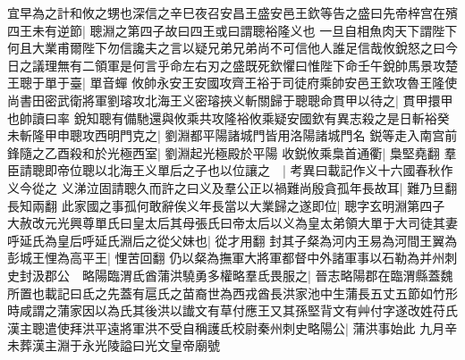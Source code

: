 宜早為之計和攸之甥也深信之辛巳夜召安昌王盛安邑王欽等告之盛曰先帝梓宫在殯四王未有逆節|{
	聰淵之第四子故曰四王或曰謂聰裕隆义也}
一旦自相魚肉天下謂陛下何且大業甫爾陛下勿信讒夫之言以疑兄弟兄弟尚不可信他人誰足信哉攸銳怒之曰今日之議理無有二領軍是何言乎命左右刃之盛既死欽懼曰惟陛下命壬午銳帥馬景攻楚王聰于單于臺|{
	單音蟬}
攸帥永安王安國攻齊王裕于司徒府乘帥安邑王欽攻魯王隆使尚書田密武衛將軍劉璿攻北海王义密璿挾义斬關歸于聰聰命貫甲以待之|{
	貫甲擐甲也帥讀曰率}
銳知聰有備馳還與攸乘共攻隆裕攸乘疑安國欽有異志殺之是日斬裕癸未斬隆甲申聰攻西明門克之|{
	劉淵都平陽諸城門皆用洛陽諸城門名}
鋭等走入南宫前鋒隨之乙酉殺和於光極西室|{
	劉淵起光極殿於平陽}
收鋭攸乘梟首通衢|{
	梟堅堯翻}
羣臣請聰即帝位聰以北海王义單后之子也以位讓之　|{
	考異曰載記作义十六國春秋作义今從之}
义涕泣固請聰久而許之曰义及羣公正以禍難尚殷貪孤年長故耳|{
	難乃旦翻長知兩翻}
此家國之事孤何敢辭俟义年長當以大業歸之遂即位|{
	聰字玄明淵第四子}
大赦改元光興尊單氏曰皇太后其母張氏曰帝太后以义為皇太弟領大單于大司徒其妻呼延氏為皇后呼延氏淵后之從父妹也|{
	從才用翻}
封其子粲為河内王易為河間王翼為彭城王悝為高平王|{
	悝苦回翻}
仍以粲為撫軍大將軍都督中外諸軍事以石勒為并州刺史封汲郡公　略陽臨渭氐酋蒲洪驍勇多權略羣氐畏服之|{
	晉志略陽郡在臨渭縣蓋魏所置也載記曰氐之先蓋有扈氏之苗裔世為西戎酋長洪家池中生蒲長五丈五節如竹形時咸謂之蒲家因以為氏其後洪以䜟文有草付應王又其孫堅背文有艸付字遂改姓苻氏}
漢主聰遣使拜洪平遠將軍洪不受自稱護氐校尉秦州刺史略陽公|{
	蒲洪事始此}
九月辛未葬漢主淵于永光陵謚曰光文皇帝廟號

